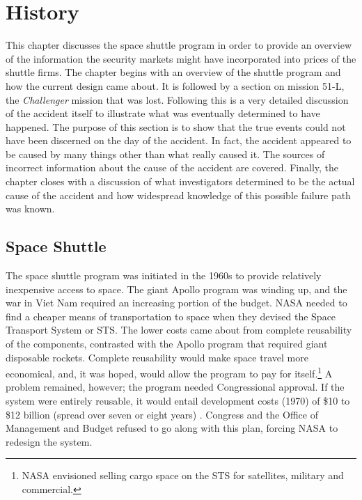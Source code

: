 \chapter{History}\label{history}

This chapter discusses the space shuttle program in order to
provide an overview of the information the security markets might
have incorporated into prices of the shuttle firms.
The chapter begins with an overview of the shuttle program
and how the current design came about.
It is followed by a section on mission 51-L, the {\em
Challenger} mission that was lost.
Following this is a very detailed discussion of the accident
itself to illustrate what was eventually determined to have
happened.
The purpose of this section is to show that the true events
could not have been discerned on the day of the accident.
In fact, the accident appeared to be caused by many things
other than what really caused it.
The sources of incorrect information about the cause of the
accident are covered.
Finally, the chapter closes with a discussion of what
investigators determined to be the actual cause of the
accident and how widespread knowledge of this possible
failure path was known.

\section{Space Shuttle}

The space shuttle program was initiated in the 1960s to
provide relatively inexpensive access to space.
The giant Apollo program was winding up, and the war in Viet
Nam required an increasing portion of the budget.
NASA needed to find a cheaper means of transportation to
space when they devised the Space Transport System or STS.
The lower costs came about from complete reusability of the
components, contrasted with the Apollo program that required
giant disposable rockets.
Complete reusability would make space travel more
economical, and, it was hoped, would allow the program to
pay for itself.\footnote{NASA envisioned selling cargo space
on the STS for satellites, military and commercial.}
A problem remained, however; the program needed
Congressional approval.
If the system were entirely reusable, it would entail
development costs (1970) of \$10 to \$12 billion (spread
over seven or eight years) \cite[p. 57]{lewis}. Congress and
the Office of Management and Budget refused to go along with
this plan, forcing NASA to redesign the system.

